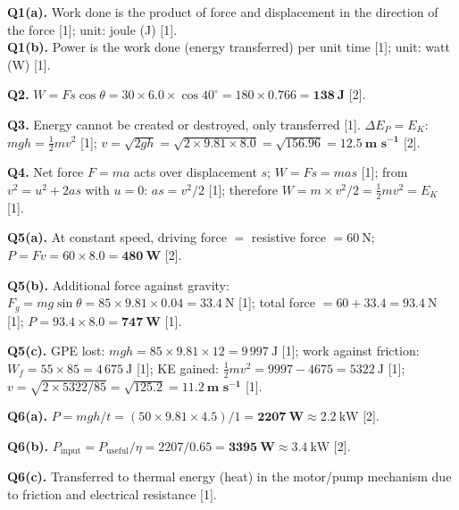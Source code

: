 \begin{markscheme}

\textbf{Q1(a).} Work done is the product of force and displacement in the direction of the force [1]; unit: joule (J) [1].\\
\textbf{Q1(b).} Power is the work done (energy transferred) per unit time [1]; unit: watt (W) [1].

\vspace{0.5em}\textbf{Q2.} $W = Fs\cos\theta = 30 \times 6.0 \times \cos40^\circ = 180 \times 0.766 = \mathbf{138\ \text{J}}$ [2].

\vspace{0.5em}\textbf{Q3.} Energy cannot be created or destroyed, only transferred [1]. $\Delta E_P = E_K$: $mgh = \tfrac{1}{2}mv^2$ [1]; $v = \sqrt{2gh} = \sqrt{2\times9.81\times8.0} = \sqrt{156.96} = \mathbf{12.5\ \text{m s}^{-1}}$ [2].

\vspace{0.5em}\textbf{Q4.} Net force $F = ma$ acts over displacement $s$; $W = Fs = mas$ [1]; from $v^2 = u^2 + 2as$ with $u = 0$: $as = v^2/2$ [1]; therefore $W = m \times v^2/2 = \tfrac{1}{2}mv^2 = E_K$ [1].

\vspace{0.5em}\textbf{Q5(a).} At constant speed, driving force $=$ resistive force $= 60\ \text{N}$; $P = Fv = 60 \times 8.0 = \mathbf{480\ \text{W}}$ [2].

\vspace{0.5em}\textbf{Q5(b).} Additional force against gravity: $F_g = mg\sin\theta = 85\times9.81\times0.04 = 33.4\ \text{N}$ [1]; total force $= 60 + 33.4 = 93.4\ \text{N}$ [1]; $P = 93.4\times8.0 = \mathbf{747\ \text{W}}$ [1].

\vspace{0.5em}\textbf{Q5(c).} GPE lost: $mgh = 85\times9.81\times12 = 9\,997\ \text{J}$ [1]; work against friction: $W_f = 55\times85 = 4\,675\ \text{J}$ [1]; KE gained: $\tfrac{1}{2}mv^2 = 9997 - 4675 = 5322\ \text{J}$ [1]; $v = \sqrt{2\times5322/85} = \sqrt{125.2} = \mathbf{11.2\ \text{m s}^{-1}}$ [1].

\vspace{0.5em}\textbf{Q6(a).} $P = mgh/t = (50\times9.81\times4.5)/1 = \mathbf{2207\ \text{W}} \approx 2.2\ \text{kW}$ [2].

\vspace{0.5em}\textbf{Q6(b).} $P_{\text{input}} = P_{\text{useful}}/\eta = 2207/0.65 = \mathbf{3395\ \text{W}} \approx 3.4\ \text{kW}$ [2].

\vspace{0.5em}\textbf{Q6(c).} Transferred to thermal energy (heat) in the motor/pump mechanism due to friction and electrical resistance [1].


\end{markscheme}
